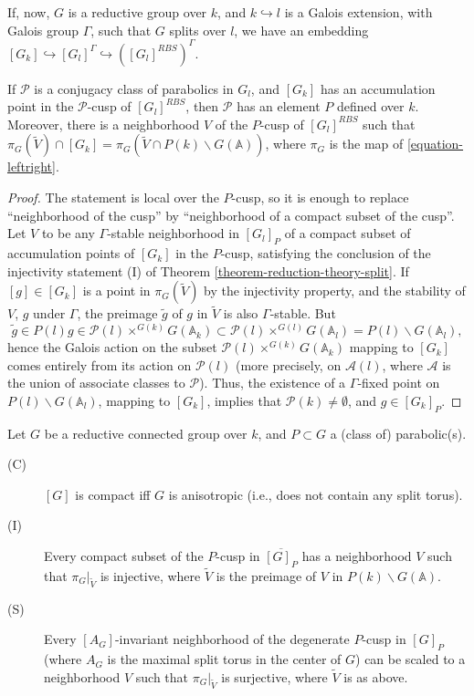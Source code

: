 If, now, $G$ is a reductive group over $k$, and $k\hookrightarrow l$ is a Galois extension, with Galois group $\Gamma$, such that $G$ splits over $l$, we have an embedding $[G_k]\hookrightarrow [G_l]^\Gamma\hookrightarrow ([G_l]^{RBS})^\Gamma$.

\begin{proposition}
 \label{proposition-Gk-in-Gl}
If $\mathcal P$ is a conjugacy class of parabolics in $G_l$, and $[G_k]$ has an accumulation point in the $\mathcal P$-cusp of $[G_l]^{RBS}$, then $\mathcal P$ has an element $P$ defined over $k$. Moreover, there is a neighborhood $V$ of the $P$-cusp of $[G_l]^{RBS}$ such that $\pi_G(\tilde V) \cap [G_k] = \pi_G(\tilde V \cap P(k)\backslash G(\mathbb A))$, where $\pi_G$ is the map of \eqref{equation-leftright}. 
\end{proposition}

\begin{proof}
The statement is local over the $P$-cusp, so it is enough to replace ``neighborhood of the cusp'' by ``neighborhood of a compact subset of the cusp''. Let $V$ to be any $\Gamma$-stable neighborhood in $[G_l]_P$ of a compact subset of accumulation points of $[G_k]$ in the $P$-cusp, satisfying the conclusion of the injectivity statement (I) of Theorem \ref{theorem-reduction-theory-split}. If $[g]\in [G_k]$ is a point in $\pi_G(\tilde V)$ by the injectivity property, and the stability of $V$, $g$ under $\Gamma$, the preimage $\tilde g$ of $g$ in $\tilde V$ is also $\Gamma$-stable. But 
$$\tilde g \in P(l)g \in \mathcal P(l)\times^{G(k)}G(\mathbb A_k)\subset \mathcal P(l)\times^{G(l)}G(\mathbb A_l) = P(l)\backslash G(\mathbb A_l),$$
hence the Galois action on the subset $\mathcal P(l)\times^{G(k)}G(\mathbb A_k)$ mapping to $[G_k]$ comes entirely from its action on $\mathcal P(l)$ (more precisely, on $\mathcal A(l)$, where $\mathcal A$ is the union of associate classes to $\mathcal P$). Thus, the existence of a $\Gamma$-fixed point on $P(l)\backslash G(\mathbb A_l)$, mapping to $[G_k]$, implies that $\mathcal P(k) \ne \emptyset$, and $g\in [G_k]_P$.
\end{proof}




\begin{theorem}
 \label{theorem-reduction-theory-general}
Let $G$ be a reductive connected group over $k$, and $P\subset G$ a (class of) parabolic(s).
 \begin{description}
  \item[(C)] $[G]$ is compact iff $G$ is anisotropic (i.e., does not contain any split torus). 
  \item[(I)] Every compact subset of the $P$-cusp in $\overline{[G]_P}$ has a neighborhood $V$ such that $\pi_G|_{\tilde V}$ is injective, where $\tilde V$ is the preimage of $V$ in $P(k)\backslash G(\mathbb A)$.
  \item[(S)] Every $[A_G]$-invariant neighborhood of the degenerate $P$-cusp in $[G]_P$ (where $A_G$ is the maximal split torus in the center of $G$) can be scaled to a neighborhood $V$ such that $\pi_G|_{\tilde V}$ is surjective, where $\tilde V$ is as above. 
 \end{description}
\end{theorem}



